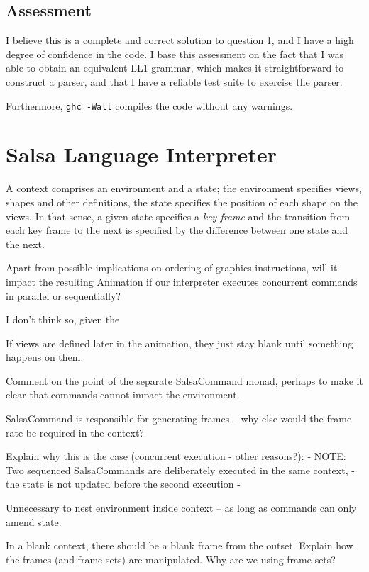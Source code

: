 \documentclass[
paper=a4,
oneside,
fontsize=11pt,
numbers=noenddot,
headinclude=false, %
footinclude=false, %
fleqn,             %
DIV=8
]{scrartcl}
\begin{document}
\subsection{Assessment}
\label{sec:assessment}

I believe this is a complete and correct solution to question 1, and I have a
high degree of confidence in the code. I base this assessment on the fact that
I was able to obtain an equivalent \acs{LL1} grammar, which makes it
straightforward to construct a parser, and that I have a reliable test suite to
exercise the parser.

Furthermore, {\tt ghc -Wall} compiles the code without any warnings.

\clearpage
\section{Salsa Language Interpreter}

A context comprises an environment and a state; the environment specifies views,
shapes and other definitions, the state specifies the position of each shape on
the views. In that sense, a given state specifies a {\em key frame} and the
transition from each key frame to the next is specified by the difference
between one state and the next.

Apart from possible implications on ordering of graphics instructions, will it
impact the resulting Animation if our interpreter executes concurrent commands
in parallel or sequentially?

I don't think so, given the 

If views are defined later in the animation, they just stay blank until
something happens on them.

Comment on the point of the separate SalsaCommand monad, perhaps to make it
clear that commands cannot impact the environment.

SalsaCommand is responsible for generating frames -- why else would the frame
rate be required in the context?

Explain why this is the case (concurrent execution - other reasons?):
{- NOTE: Two sequenced SalsaCommands are deliberately executed in the same context,
 - the state is not updated before the second execution -}

Unnecessary to nest environment inside context -- as long as commands can only
amend state.

In a blank context, there should be a blank frame from the outset. Explain how
the frames (and frame sets) are manipulated.  Why are we using frame sets?
\end{document}
